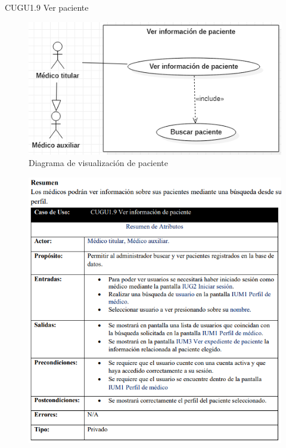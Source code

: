 \documentclass[12pt,letterpaper]{article}
\begin{document}
            \newpage
            CUGU1.9 Ver paciente 
            \begin{figure}[H]
                \centering
                \includegraphics [scale=0.5]{casosUso/verInformacionPaciente}
                \caption{Diagrama de visualización de paciente}
            \end{figure}
            \begin{figure}[H]
                \centering
                \includegraphics [scale=0.8]{specs/specVerPaciente}
            \end{figure}
\end{document}
